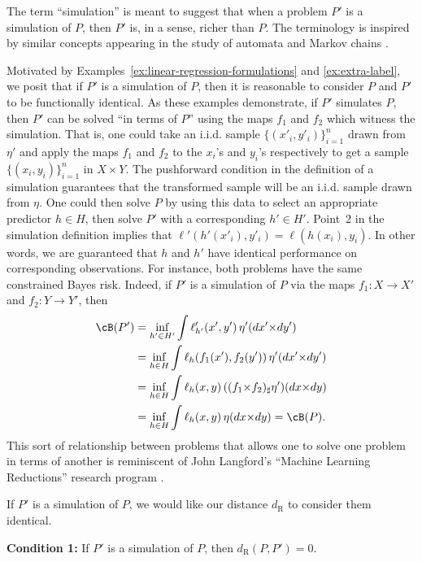 \documentclass[twoside,11pt]{article}
\newcommand{\dexp}[1][]{d_{\mathrm{R}#1}}
\begin{document}
The term ``simulation'' is meant to suggest that when a problem $P'$ is a simulation of $P$, then $P'$ is, in a sense,  richer than $P$. The terminology is inspired by similar concepts appearing in the study of automata and Markov chains \citep{larsen1989bisimulation, milner1980calculus,milner1989communication}.


Motivated by Examples~\ref{ex:linear-regression-formulations} and \ref{ex:extra-label}, we posit that if $P'$ is a simulation of $P$, then it is reasonable to consider $P$ and $P'$ to be functionally identical. As these examples demonstrate, if $P'$ simulates $P$, then $P'$ can be solved ``in terms of $P$'' using the maps $f_1$ and $f_2$ which witness the simulation. That is, one could take an i.i.d. sample $\{(x'_i,y'_i)\}_{i=1}^n$ drawn from $\eta'$ and apply the maps $f_1$ and $f_2$ to the $x_i$'s and $y_i$'s respectively to get a sample $\{(x_i,y_i)\}_{i=1}^n$ in $X\times Y$. The pushforward condition in the definition of a simulation guarantees that the transformed sample will be an i.i.d. sample drawn from $\eta$. One could then solve $P$ by using this data to select an appropriate predictor $h\in H$, then solve $P'$ with a corresponding $h' \in H'$. Point~2 in the simulation definition implies that $\ell'(h'(x'_i),y'_i) = \ell(h(x_i), y_i)$. In other words, we are guaranteed that $h$ and $h'$ have identical performance on corresponding observations.
For instance, both problems have the same constrained Bayes risk. Indeed, if $P'$ is a simulation of $P$ via the maps $f_1:X\to X'$ and $f_2:Y \to Y'$, then
\begin{align*}
    \cB(P') &= \inf_{h'\in H'} \int \ell'_{h'}(x',y')\, \eta'(dx'{\times}dy')
    \\ & =
    \inf_{h\in H} \int \ell_h(f_1(x'),f_2(y'))\, \eta'(dx'{\times}dy')
    \\ & =
    \inf_{h\in H} \int \ell_h(x, y)\, ((f_1{\times} f_2)_\sharp\eta')(dx{\times}dy)
    \\ & =
    \inf_{h\in H} \int \ell_h(x, y)\, \eta(dx{\times}dy) = \cB(P).
\end{align*}
This sort of relationship between problems that allows one to solve one problem in terms of another is reminiscent of John Langford's ``Machine Learning Reductions'' research program \citep{Langford:2009aa}.

If $P'$ is a simulation of $P$, we would like our distance $\dexp$ to consider them identical.
\begin{tcolorbox}[colback=white]
    \textbf{Condition 1:} If $P'$ is a simulation of $P$, then $\dexp(P,P')=0$.
\end{tcolorbox}
\end{document}
